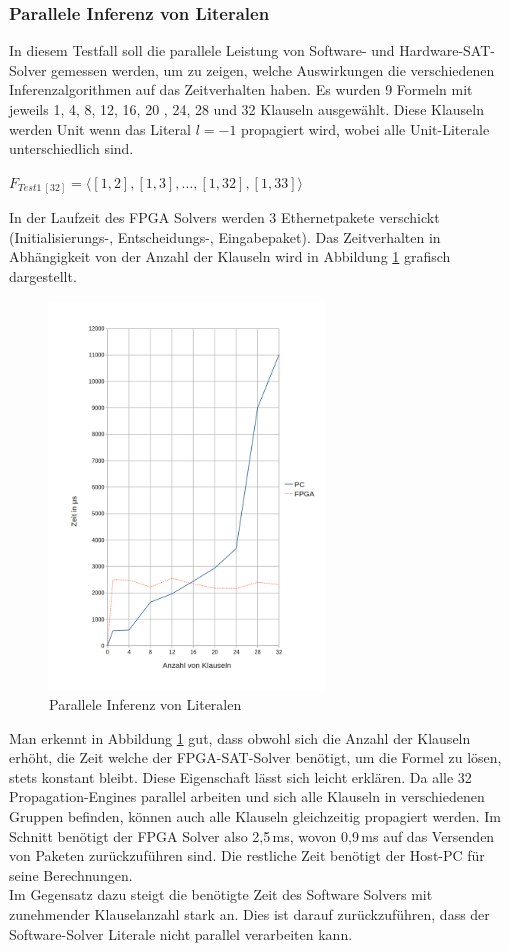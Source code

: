 \subsubsection{Parallele Inferenz von Literalen}
In diesem Testfall soll die parallele Leistung
von Software- und Hardware-SAT-Solver gemessen
werden, um zu zeigen, welche Auswirkungen die
verschiedenen Inferenzalgorithmen auf
das Zeitverhalten haben. Es wurden 9 Formeln 
mit jeweils 1, 4, 8, 12, 16, 20 , 24, 28 und 32
Klauseln ausgewählt. Diese Klauseln werden Unit wenn das Literal
$l = -1$ propagiert wird, wobei alle Unit-Literale unterschiedlich sind.
\begin{center}
      $F_{Test1\ [32]} = \langle [1,2],[1,3],...,[1,32],[1,33]\rangle$
\end{center}
In der Laufzeit des FPGA Solvers werden 
3 Ethernetpakete verschickt (Initialisierungs-, Entscheidungs-,
Eingabepaket).
Das Zeitverhalten in Abhängigkeit von
der Anzahl der Klauseln wird in Abbildung \ref{parallelinferenz}
grafisch dargestellt.
\begin{figure}[h]
  \includegraphics[width=0.65\textwidth]{abb/testfall1.png}
  \caption{Parallele Inferenz von Literalen}
  \label{parallelinferenz}
\end{figure}
Man erkennt in Abbildung \ref{parallelinferenz} gut, dass obwohl sich
die Anzahl der Klauseln erhöht, die Zeit welche der FPGA-SAT-Solver benötigt, 
um die Formel zu lösen, stets konstant bleibt. Diese Eigenschaft lässt sich
leicht erklären. Da alle 32 Propagation-Engines parallel arbeiten und sich
alle Klauseln in verschiedenen Gruppen befinden, können auch alle
Klauseln gleichzeitig propagiert werden.
Im Schnitt benötigt der FPGA Solver also 2,5\,ms, wovon 0,9\,ms auf das
Versenden von Paketen zurückzuführen sind. Die restliche Zeit
benötigt der Host-PC für seine Berechnungen.\\
Im Gegensatz dazu steigt die benötigte Zeit des Software Solvers
mit zunehmender Klauselanzahl stark an. Dies 
ist darauf zurückzuführen, dass der Software-Solver
Literale nicht parallel verarbeiten kann.

